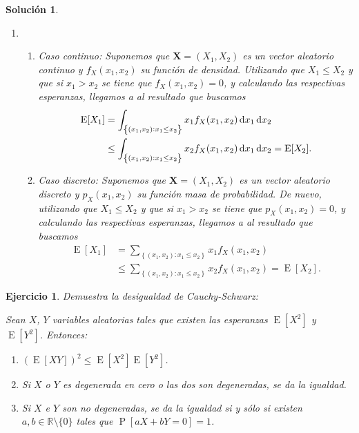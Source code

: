 \documentclass[
  a4paper,
  spanish,
  12pt,
]{scrartcl}
\theoremstyle{ejercicio-style}
\newtheorem{ejer}{Ejercicio}
\theoremstyle{remark-style}
\newtheorem*{sol}{Solución}
\begin{document}
\begin{sol}
\begin{enumerate}
    \item
      \begin{enumerate}
        \item Caso continuo: Suponemos que \(\symbf{X} = (X_1, X_2)\) es un vector aleatorio continuo y \(f_X(x_1, x_2)\) su función de densidad. 
        Utilizando que \(X_1 \leq X_2\) y que si \(x_1 > x_2\) se tiene que \(f_X(x_1, x_2) = 0\), y calculando las respectivas esperanzas, llegamos a al resultado que buscamos
          \begin{align*}
            \operatorname{E}[X_1] &= \int_{\left\{(x_1, x_2) : x_1 \leq x_2\right\}} x_1 f_X (x_1, x_2) \dif x_1 \dif x_2 \\
              &\leq \int_{\left\{(x_1, x_2) : x_1 \leq x_2\right\}} x_2 f_X (x_1, x_2) \dif x_1 \dif x_2 = \operatorname{E}[X_2].
          \end{align*}
          
        \item Caso discreto: Suponemos que \(\symbf{X} = (X_1, X_2)\) es un vector aleatorio discreto y \(p_X(x_1, x_2)\) su función masa de probabilidad. De nuevo, utilizando que \(X_1 \leq X_2\) y que si \(x_1 > x_2\) se tiene que \(p_X(x_1, x_2) = 0\), y calculando las respectivas esperanzas, llegamos a al resultado que buscamos
          \begin{align*}
            \operatorname{E}[X_1] &= \sum_{\left\{(x_1, x_2) : x_1 \leq x_2\right\}} x_1 f_X (x_1, x_2) \\
              &\leq \sum_{\left\{(x_1, x_2) : x_1 \leq x_2\right\}} x_2 f_X (x_1, x_2) = \operatorname{E}[X_2].
          \end{align*}
      \end{enumerate}
  \end{enumerate}
\end{sol}

\newpage

\begin{ejer}
  Demuestra la desigualdad de Cauchy-Schwarz: \begin{displayquote}
    Sean \(X\), \(Y\) variables aleatorias tales que existen las esperanzas \(\operatorname{E}[X^2]\) y \(\operatorname{E}[Y^2]\). Entonces:
    \begin{enumerate}
      \item \(\left(\operatorname{E}[XY]\right)^2 \leq \operatorname{E}[X^2] \operatorname{E}[Y^2]\).
      \item Si \(X\) o \(Y\) es degenerada en cero o las dos son degeneradas, se da la igualdad.
      \item Si \(X\) e \(Y\) son no degeneradas, se da la igualdad si y sólo si existen \(a,b \in \mathbb{R}\setminus\{0\}\) tales que \(\operatorname{P}[aX+bY=0] = 1\).
    \end{enumerate}
  \end{displayquote}
\end{ejer}
\end{document}
